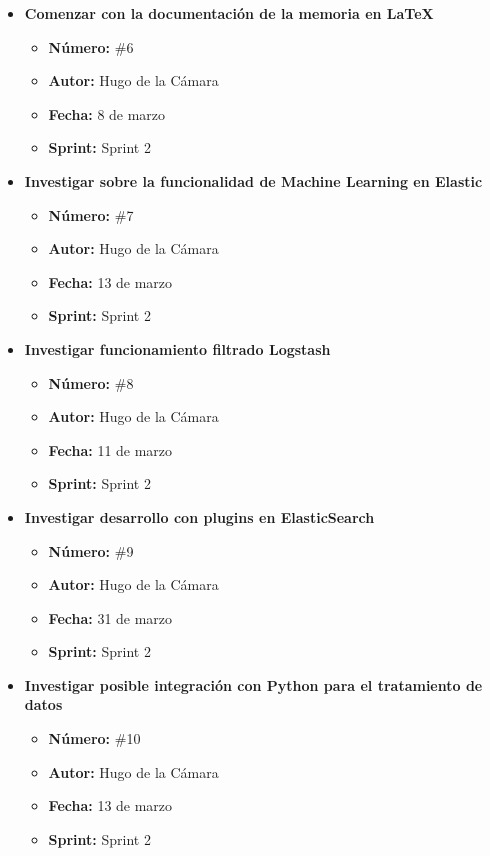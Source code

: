 \begin{itemize}
    \item \textbf{Comenzar con la documentación de la memoria en LaTeX}
    \begin{itemize}
        \item \textbf{Número:} \#6
        \item \textbf{Autor:} Hugo de la Cámara
        \item \textbf{Fecha:} 8 de marzo
        \item \textbf{Sprint:} Sprint 2
    \end{itemize}
    
    \item \textbf{Investigar sobre la funcionalidad de Machine Learning en Elastic}
    \begin{itemize}
        \item \textbf{Número:} \#7
        \item \textbf{Autor:} Hugo de la Cámara
        \item \textbf{Fecha:} 13 de marzo
        \item \textbf{Sprint:} Sprint 2
    \end{itemize}
    
    \item \textbf{Investigar funcionamiento filtrado Logstash}
    \begin{itemize}
        \item \textbf{Número:} \#8
        \item \textbf{Autor:} Hugo de la Cámara
        \item \textbf{Fecha:} 11 de marzo
        \item \textbf{Sprint:} Sprint 2
    \end{itemize}
    
    \item \textbf{Investigar desarrollo con plugins en ElasticSearch}
    \begin{itemize}
        \item \textbf{Número:} \#9
        \item \textbf{Autor:} Hugo de la Cámara
        \item \textbf{Fecha:} 31 de marzo
        \item \textbf{Sprint:} Sprint 2
    \end{itemize}
    
    \item \textbf{Investigar posible integración con Python para el tratamiento de datos}
    \begin{itemize}
        \item \textbf{Número:} \#10
        \item \textbf{Autor:} Hugo de la Cámara
        \item \textbf{Fecha:} 13 de marzo
        \item \textbf{Sprint:} Sprint 2
    \end{itemize}
    

\end{itemize}
